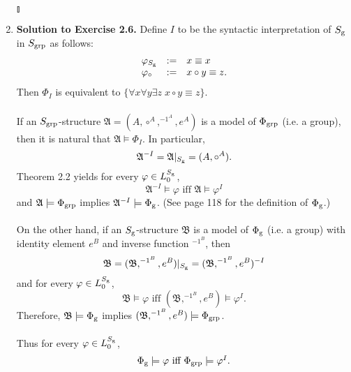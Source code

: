 \begin{enumerate}[1.]
\begin{enumerate}[(a)]
\[\]
\end{enumerate} \begin{flushright}$\talloblong$\end{flushright}
%
\item \textbf{Solution to Exercise 2.6.} Define $I$ to be the syntactic interpretation of $S_{\mbox{\scriptsize g}}$ in $S_{\mbox{\scriptsize grp}}$ as follows:
\[
\begin{array}{lll}
\varphi_{S_{\mbox{\tiny g}}} & := & x \equiv x \\
\varphi_\circ & := & x \circ y \equiv z.
\end{array}
\]
Then $\Phi_I$ is equivalent to $\{ \forall x \forall y \exists z \; x \circ y \equiv z \}$.\\
\\
If an $S_{\mbox{\scriptsize grp}}$-structure $\mathfrak{A} = (A, \circ^A, ^{-1^A}, e^A)$ is a model of $\Phi_{\mbox{\scriptsize grp}}$ (i.e. a group), then it is natural that $\mathfrak{A} \models \Phi_I$. In particular,
\[
\mathfrak{A}^{-I} = \mathfrak{A} |_{S_{\mbox{\tiny g}}} = (A, \circ^A).
\]
Theorem 2.2 yields for every $\varphi \in L_0^{S_{\mbox{\tiny g}}}$,
\[
\mbox{$\mathfrak{A}^{-I} \models \varphi$ iff $\mathfrak{A} \models \varphi^I$}
\]
and $\mathfrak{A} \models \Phi_{\mbox{\scriptsize grp}}$ implies $\mathfrak{A}^{-I} \models \Phi_{\mbox{\scriptsize g}}$. (See page 118 for the definition of $\Phi_{\mbox{\scriptsize g}}$.)\\
\\
On the other hand, if an $S_{\mbox{\scriptsize g}}$-structure $\mathfrak{B}$ is a model of $\Phi_{\mbox{\scriptsize g}}$ (i.e. a group) with identity element $e^B$ and inverse function $^{-1^B}$, then
\[
\mathfrak{B} = (\mathfrak{B}, ^{-1^B}, e^B) |_{S_{\mbox{\tiny g}}} = (\mathfrak{B}, ^{-1^B}, e^B)^{-I}
\]
and for every $\varphi \in L_0^{S_{\mbox{\tiny g}}}$,
\[
\mbox{$\mathfrak{B} \models \varphi$ iff $(\mathfrak{B}, ^{-1^B}, e^B) \models \varphi^I$}.
\]
Therefore, $\mathfrak{B} \models \Phi_{\mbox{\scriptsize g}}$ implies $(\mathfrak{B}, ^{-1^B}, e^B) \models \Phi_{\mbox{\scriptsize grp}}$.\\
\\
Thus for every $\varphi \in L_0^{S_{\mbox{\tiny g}}}$,
\[
\mbox{$\Phi_{\mbox{\scriptsize g}} \models \varphi$ iff $\Phi_{\mbox{\scriptsize grp}} \models \varphi^I$}.
\]
\end{enumerate}
